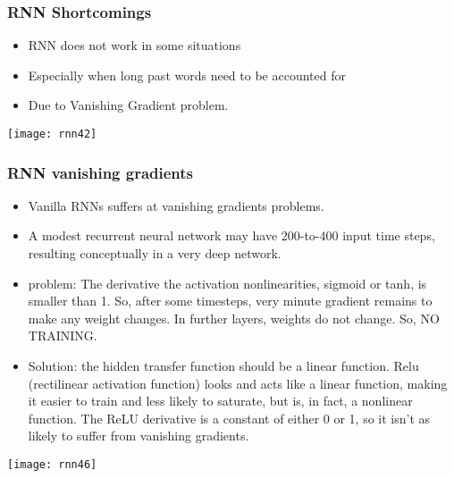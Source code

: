 


\begin{frame}[fragile] \frametitle{RNN Shortcomings}
\begin{itemize}
\item RNN does not work in some situations
\item Especially when long past words need to be accounted for
\item Due to Vanishing Gradient problem.
\end{itemize}

\begin{center}
\texttt{[image: rnn42]}
\end{center}
\end{frame}

\begin{frame}[fragile] \frametitle{RNN vanishing gradients}
\begin{itemize}
\item Vanilla RNNs suffers at vanishing gradients problems.
\item A modest recurrent neural network may have 200-to-400 input time steps, resulting conceptually in a very deep network.
\item problem: The derivative the activation nonlinearities, sigmoid or tanh, is smaller
than 1. So, after some timesteps, very minute gradient remains to make any weight changes. In further layers, weights do not change. So, NO TRAINING.
\item Solution: the hidden transfer function should be a linear function. Relu (rectilinear activation function) looks and acts like a linear function, making it easier to train and less likely to saturate, but is, in fact, a nonlinear function. The ReLU derivative is a constant of either 0 or 1, so it isn’t as likely to suffer from vanishing gradients.
\end{itemize}

\begin{center}
\texttt{[image: rnn46]}
\end{center}
\end{frame}

